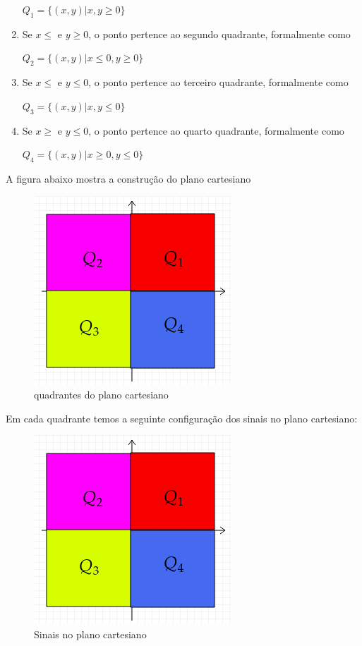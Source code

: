 \begin{multicols*}{2}
\begin{enumerate}
    $Q_1 = \{ (x,y)| x,y \ge 0 \}$
    \item Se $x \le $ e $ y \ge 0 $, o ponto pertence ao segundo quadrante, formalmente como
    
    $Q_2 = \{  (x,y) | x \le 0, y \ge 0 \}$
    
    \item Se $x \le $ e $ y \le 0 $, o ponto pertence ao terceiro quadrante, formalmente como 
    
    $Q_3 = \{  (x,y) | x , y \le 0 \}$
    
    \item Se $x \ge $ e $ y \le 0 $, o ponto pertence ao quarto quadrante, formalmente como 
    
    $Q_4 = \{  (x,y) | x \ge 0 ,y \le 0 \}$
    \end{enumerate}
    
    A figura abaixo mostra a construção do plano cartesiano 
    \begin{figure}[H]
    \caption{quadrantes do plano cartesiano}
        \includegraphics[scale=0.5]{assets/rafael/img28.png}
    \end{figure}
    Em cada quadrante temos a seguinte configuração dos sinais no plano cartesiano:
    \begin{figure}[H]
    \caption{Sinais no plano cartesiano}
        \includegraphics[scale=0.5]{assets/rafael/img28.png}
    \end{figure}
    

\end{multicols*}

